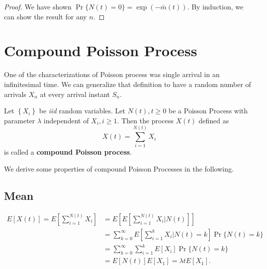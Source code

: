\documentclass[a4paper,10pt,english]{article}
\begin{document}
\begin{proof}
We have shown $\Pr\{N(t)=0\} = \exp(-\bar{m}(t))$. By induction, we can show the result for any $n$.
\end{proof}
\section{Compound Poisson Process}
One of the characterizations of Poisson process was single arrival in an infinitesimal time. We can generalize that definition to have a random number of arrivals $X_n$ at every arrival instant $S_n$.
\begin{defn} Let $\left\{X_i\right\}$ be \emph{iid} random variables. Let $N(t), t\geq 0$ be a Poisson Process with parameter $\lambda$ independent of $X_i, i\geq 1$. Then the process $X(t)$ defined as
\begin{equation*}
X(t) = \sum_{i=1}^{N(t)} X_i
\end{equation*}
is called a \textbf{compound Poisson process}.
\end{defn}
We derive some properties of compound Poisson Processes in the following.
\subsection{Mean}
\begin{align*}
E[X(t)] = E[\sum_{i=1}^{N(t)} X_i] &= E[E[\sum_{i=1}^{N(t)} X_i|N(t)]] \\
&= \sum_{k=0}^\infty E\left[\sum_{i=1}^{k} X_i|N(t)=k\right]\Pr\{N(t) = k\}\\
&= \sum_{k=0}^\infty \sum_{i=1}^{k} E[X_i]\Pr\{N(t) = k\}\\
&= E[N(t)]E[X_1] = \lambda tE[X_1].
\end{align*}
\end{document}
